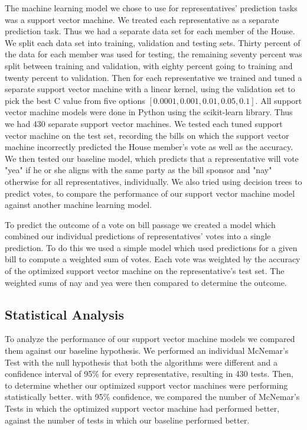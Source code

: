 \documentclass[11pt,letterpaper,twocolumn]{article}
\begin{document}
The machine learning model we chose to use for representatives' prediction tasks was a support vector machine. We treated each representative as a separate prediction task. Thus we had a separate data set for each member of the House. We split each data set into training, validation and testing sets. Thirty percent of the data for each member was used for testing, the remaining seventy percent was split between training and validation, with eighty percent going to training and twenty percent to validation. Then for each representative we trained and tuned a separate support vector machine with a linear kernel, using the validation set to pick the best C value from five options $[0.0001, 0.001, 0.01, 0.05, 0.1]$. All support vector machine models were done in Python using the scikit-learn library. Thus we had 430 separate support vector machines. We tested each tuned support vector machine on the test set, recording the bills on which the support vector machine incorrectly predicted the House member's vote as well as the accuracy. We then tested our baseline model, which predicts that a representative will vote "yea" if he or she aligns with the same party as the bill sponsor and "nay" otherwise for all representatives, individually. We also tried using decision trees to predict votes, to compare the performance of our support vector machine model against another machine learning model.

To predict the outcome of a vote on bill passage we created a model which combined our individual predictions of representatives' votes into a single prediction. To do this we used a simple model which used predictions for a given bill to compute a weighted sum of votes. Each vote was weighted by the accuracy of the optimized support vector machine on the representative's test set. The weighted sums of nay and yea were then compared to determine the outcome.

\subsection{Statistical Analysis}

To analyze the performance of our support vector machine models we compared them against our baseline hypothesis. We performed an individual McNemar's Test with the null hypothesis that both the algorithms were different and a confidence interval of 95\% for every representative, resulting in 430 tests. Then, to determine whether our optimized support vector machines were performing statistically better.  with 95\% confidence, we compared the number of McNemar's Tests in which the optimized support vector machine had performed better, against the number of tests in which our baseline performed better.
\end{document}
